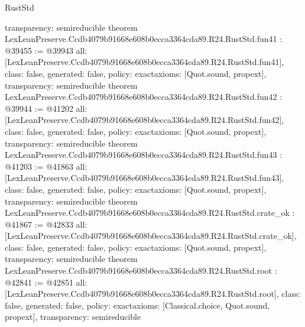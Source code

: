 \begin{lexlean}{RustStd}
\begin{coremodule}
{  transparency: semireducible
}
theorem LexLeanPreserve.Ccdb4079b91668e608b0ecca3364cda89.R24.RustStd.fun41 : @39455 := @39943 {
  all: [LexLeanPreserve.Ccdb4079b91668e608b0ecca3364cda89.R24.RustStd.fun41],
  class: false,
  generated: false,
  policy: exact{axioms: [Quot.sound, propext]},
  transparency: semireducible
}
theorem LexLeanPreserve.Ccdb4079b91668e608b0ecca3364cda89.R24.RustStd.fun42 : @39944 := @41202 {
  all: [LexLeanPreserve.Ccdb4079b91668e608b0ecca3364cda89.R24.RustStd.fun42],
  class: false,
  generated: false,
  policy: exact{axioms: [Quot.sound, propext]},
  transparency: semireducible
}
theorem LexLeanPreserve.Ccdb4079b91668e608b0ecca3364cda89.R24.RustStd.fun43 : @41203 := @41863 {
  all: [LexLeanPreserve.Ccdb4079b91668e608b0ecca3364cda89.R24.RustStd.fun43],
  class: false,
  generated: false,
  policy: exact{axioms: [Quot.sound, propext]},
  transparency: semireducible
}
theorem LexLeanPreserve.Ccdb4079b91668e608b0ecca3364cda89.R24.RustStd.crate_ok : @41867 := @42833 {
  all: [LexLeanPreserve.Ccdb4079b91668e608b0ecca3364cda89.R24.RustStd.crate_ok],
  class: false,
  generated: false,
  policy: exact{axioms: [Quot.sound, propext]},
  transparency: semireducible
}
theorem LexLeanPreserve.Ccdb4079b91668e608b0ecca3364cda89.R24.RustStd.root : @42841 := @42851 {
  all: [LexLeanPreserve.Ccdb4079b91668e608b0ecca3364cda89.R24.RustStd.root],
  class: false,
  generated: false,
  policy: exact{axioms: [Classical.choice, Quot.sound, propext]},
  transparency: semireducible
}


\end{coremodule}
\end{lexlean}
